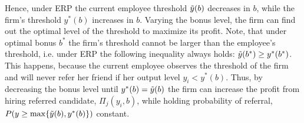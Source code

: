 \documentclass[12pt]{article}
\begin{document}
Hence, under ERP the current employee threshold $\Tilde{y}(b)$ decreases in $b$, while the firm's threshold $y^*(b)$ increases in $b$. Varying the bonus level, the firm can find out the optimal level of the threshold to maximize its profit. Note, that under optimal bonus $b^*$ the firm's threshold cannot be larger than the employee's threshold, i.e. under ERP the following inequality always holds: $\Tilde{y}(b^*) \geq y^*(b^*)$. This happens, because the current employee observes the threshold of the firm and will never refer her friend if her output level $y_i < y^*(b)$. Thus, by decreasing the bonus level until $y^*(b) = \Tilde{y}(b)$ the firm can increase the profit from hiring referred candidate, $\Pi_j(y_i, b)$, while holding probability of referral, $P(y \geq \max \lbrace \Tilde{y}(b), y^*(b)\rbrace)$ constant. 
\end{document}
